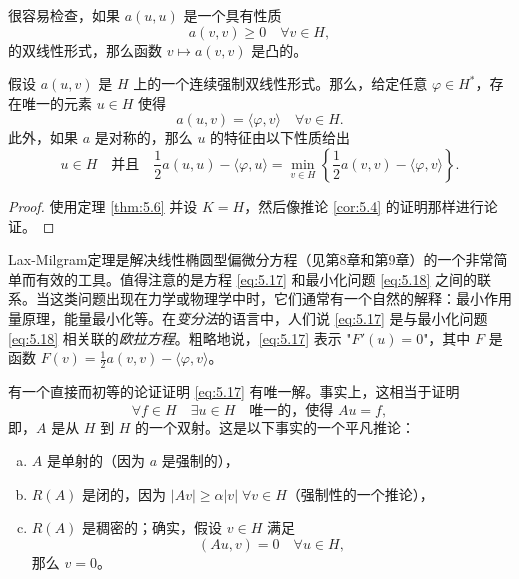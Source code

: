\begin{remark}
很容易检查，如果 $a(u,u)$ 是一个具有性质
\[ a(v,v) \ge 0 \quad \forall v \in H, \]
的双线性形式，那么函数 $v \mapsto a(v,v)$ 是凸的。
\end{remark}

\begin{corollary}\label{cor:5.8}
假设 $a(u,v)$ 是 $H$ 上的一个连续强制双线性形式。那么，给定任意 $\varphi \in H^*$，存在唯一的元素 $u \in H$ 使得
\begin{equation}\label{eq:5.17}
a(u,v) = \langle \varphi, v \rangle \quad \forall v \in H.
\end{equation}
此外，如果 $a$ 是对称的，那么 $u$ 的特征由以下性质给出
\begin{equation}\label{eq:5.18}
u \in H \quad \text{并且} \quad \frac{1}{2}a(u,u) - \langle \varphi, u \rangle = \min_{v \in H} \left\{ \frac{1}{2}a(v,v) - \langle \varphi, v \rangle \right\}.
\end{equation}
\end{corollary}
\begin{proof}
使用定理 \ref{thm:5.6} 并设 $K=H$，然后像推论 \ref{cor:5.4} 的证明那样进行论证。
\end{proof}

\begin{remark}
Lax-Milgram定理是解决线性椭圆型偏微分方程（见第8章和第9章）的一个非常简单而有效的工具。值得注意的是方程 \eqref{eq:5.17} 和最小化问题 \eqref{eq:5.18} 之间的联系。当这类问题出现在力学或物理学中时，它们通常有一个自然的解释：最小作用量原理，能量最小化等。在\textit{变分法}的语言中，人们说 \eqref{eq:5.17} 是与最小化问题 \eqref{eq:5.18} 相关联的\textit{欧拉方程}。粗略地说，\eqref{eq:5.17} 表示 "$F'(u)=0$"，其中 $F$ 是函数 $F(v) = \frac{1}{2}a(v,v) - \langle \varphi, v \rangle$。
\end{remark}

\begin{remark}
有一个直接而初等的论证证明 \eqref{eq:5.17} 有唯一解。事实上，这相当于证明
\[ \forall f \in H \quad \exists u \in H \quad \text{唯一的，使得 } Au=f, \]
即，$A$ 是从 $H$ 到 $H$ 的一个双射。这是以下事实的一个平凡推论：
\begin{enumerate}[(a)]
    \item $A$ 是单射的（因为 $a$ 是强制的），
    \item $R(A)$ 是闭的，因为 $|Av| \ge \alpha|v| \; \forall v \in H$（强制性的一个推论），
    \item $R(A)$ 是稠密的；确实，假设 $v \in H$ 满足
    \[ (Au, v) = 0 \quad \forall u \in H, \]
    那么 $v=0$。
\end{enumerate}
\end{remark}

